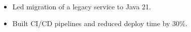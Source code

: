 \begin{itemize}
  \item[--] Led migration of a legacy service to Java 21.
  \item[+] Built CI/CD pipelines and reduced deploy time by 30\%.
\end{itemize}
